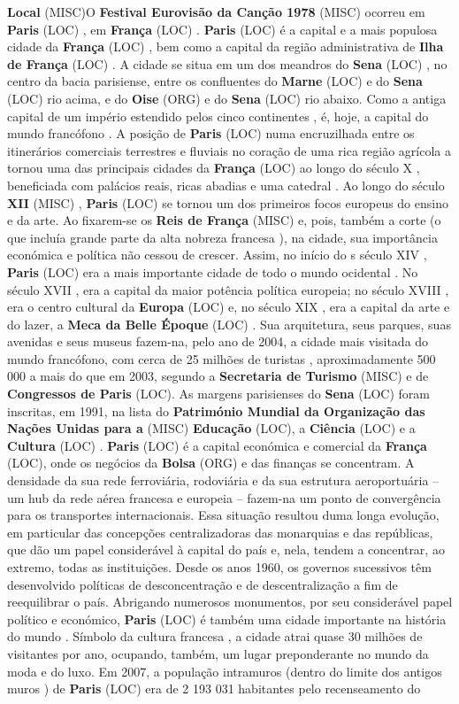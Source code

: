 \documentclass[12pt,a4paper]{article}
\begin{document}
\textbf{Local} (MISC)O \textbf{Festival Eurovisão da Canção 1978} (MISC) ocorreu em \textbf{Paris} (LOC) , em \textbf{França} (LOC) . \textbf{Paris} (LOC) é a capital e a mais populosa cidade da \textbf{França} (LOC) , bem como a capital da região administrativa de \textbf{Ilha de França} (LOC) . A cidade se situa em um dos meandros do \textbf{Sena} (LOC) , no centro da bacia parisiense, entre os confluentes do \textbf{Marne} (LOC) e do \textbf{Sena} (LOC) rio acima, e do \textbf{Oise} (ORG) e do \textbf{Sena} (LOC) rio abaixo. Como a antiga capital de um império estendido pelos cinco continentes , é, hoje, a capital do mundo francófono . A posição de \textbf{Paris} (LOC) numa encruzilhada entre os itinerários comerciais terrestres e fluviais no coração de uma rica região agrícola a tornou uma das principais cidades da \textbf{França} (LOC) ao longo do século X , beneficiada com palácios reais, ricas abadias e uma catedral . Ao longo do século \textbf{XII} (MISC) , \textbf{Paris} (LOC) se tornou um dos primeiros focos europeus do ensino e da arte. Ao fixarem-se os \textbf{Reis de França} (MISC) e, pois, também a corte (o que incluía grande parte da alta nobreza francesa ), na cidade, sua importância económica e política não cessou de crescer. Assim, no início do s século XIV , \textbf{Paris} (LOC) era a mais importante cidade de todo o mundo ocidental . No século XVII , era a capital da maior potência política europeia; no século XVIII , era o centro cultural da \textbf{Europa} (LOC) e, no século XIX , era a capital da arte e do lazer, a \textbf{Meca da Belle Époque} (LOC) . Sua arquitetura, seus parques, suas avenidas e seus museus fazem-na, pelo ano de 2004, a cidade mais visitada do mundo francófono, com cerca de 25 milhões de turistas , aproximadamente 500 000 a mais do que em 2003, segundo a \textbf{Secretaria de Turismo} (MISC) e de \textbf{Congressos de Paris} (LOC). As margens parisienses do \textbf{Sena} (LOC) foram inscritas, em 1991, na lista do \textbf{Património Mundial da Organização das Nações Unidas para a} (MISC) \textbf{Educação} (LOC), a \textbf{Ciência} (LOC) e a \textbf{Cultura} (LOC) . \textbf{Paris} (LOC) é a capital económica e comercial da \textbf{França} (LOC), onde os negócios da \textbf{Bolsa} (ORG) e das finanças se concentram. A densidade da sua rede ferroviária, rodoviária e da sua estrutura aeroportuária -- um hub da rede aérea francesa e europeia -- fazem-na um ponto de convergência para os transportes internacionais. Essa situação resultou duma longa evolução, em particular das concepções centralizadoras das monarquias e das repúblicas, que dão um papel considerável à capital do país e, nela, tendem a concentrar, ao extremo, todas as instituições. Desde os anos 1960, os governos sucessivos têm desenvolvido políticas de desconcentração e de descentralização a fim de reequilibrar o país. Abrigando numerosos monumentos, por seu considerável papel político e económico, \textbf{Paris} (LOC) é também uma cidade importante na história do mundo . Símbolo da cultura francesa , a cidade atrai quase 30 milhões de visitantes por ano, ocupando, também, um lugar preponderante no mundo da moda e do luxo. Em 2007, a população intramuros (dentro do limite dos antigos muros ) de \textbf{Paris} (LOC) era de 2 193 031 habitantes pelo recenseamento do 
\end{document}

